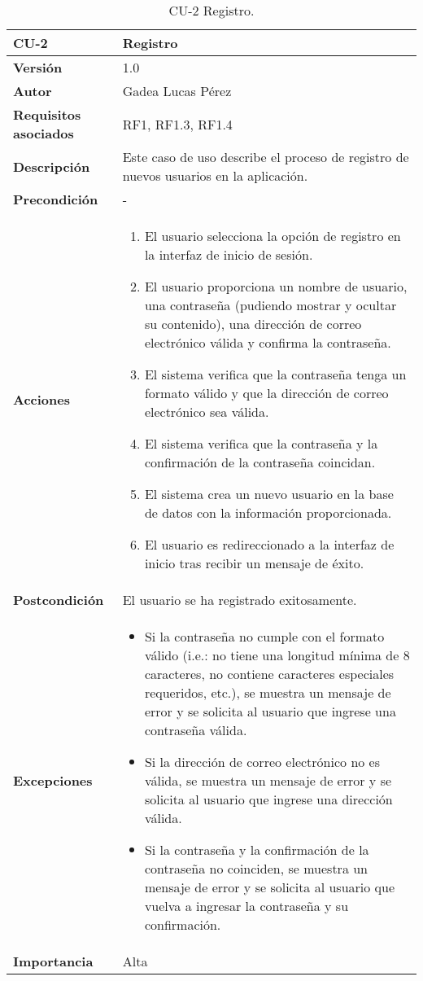 \begin{itemize}
\begin{table}[p]
\centering
\begin{tabularx}{\linewidth}{ p{} p{} }
\toprule
\textbf{CU-2} & \textbf{Registro}\\
\toprule
\textbf{Versión} & 1.0 \\
\textbf{Autor} & Gadea Lucas Pérez \\
\textbf{Requisitos asociados} & RF1, RF1.3, RF1.4  \\
\textbf{Descripción} & Este caso de uso describe el proceso de registro de nuevos usuarios en la aplicación.\\
\textbf{Precondición} & - \\
\textbf{Acciones} &
\begin{enumerate}
\def\labelenumi{\arabic{enumi}.}
\tightlist
\item El usuario selecciona la opción de registro en la interfaz de inicio de sesión.
\item El usuario proporciona un nombre de usuario, una contraseña (pudiendo mostrar y ocultar su contenido), una dirección de correo electrónico válida y confirma la contraseña.
\item El sistema verifica que la contraseña tenga un formato válido y que la dirección de correo electrónico sea válida.
\item El sistema verifica que la contraseña y la confirmación de la contraseña coincidan.
\item El sistema crea un nuevo usuario en la base de datos con la información proporcionada.
\item El usuario es redireccionado a la interfaz de inicio tras recibir un mensaje de éxito.
\end{enumerate}\\
\textbf{Postcondición} & El usuario se ha registrado exitosamente.\\
\textbf{Excepciones} &
\begin{itemize}
\item Si la contraseña no cumple con el formato válido (i.e.: no tiene una longitud mínima de 8 caracteres, no contiene caracteres especiales requeridos, etc.), se muestra un mensaje de error y se solicita al usuario que ingrese una contraseña válida.
\item Si la dirección de correo electrónico no es válida, se muestra un mensaje de error y se solicita al usuario que ingrese una dirección válida.
\item Si la contraseña y la confirmación de la contraseña no coinciden, se muestra un mensaje de error y se solicita al usuario que vuelva a ingresar la contraseña y su confirmación.
\end{itemize}\\
\textbf{Importancia} & Alta\\
\bottomrule
\end{tabularx}
\caption{CU-2 Registro.}
\label{tab:cu2}
\end{table}


\end{itemize}
